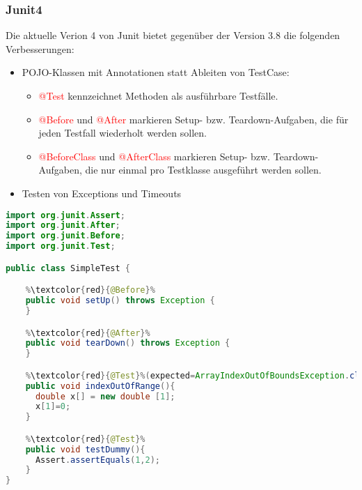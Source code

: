 \subsubsection{Junit4}
Die aktuelle Verion 4 von Junit bietet gegenüber der Version 3.8
die folgenden Verbesserungen:
\begin{itemize}
\item POJO-Klassen mit Annotationen statt Ableiten von TestCase:
\begin{itemize}
\item \textcolor{red}{@Test} kennzeichnet Methoden als ausführbare Testfälle.
\item \textcolor{red}{@Before} und \textcolor{red}{@After}
  markieren Setup- bzw. Teardown-Aufgaben, die
  für jeden Testfall wiederholt werden sollen.
\item \textcolor{red}{@BeforeClass} und \textcolor{red}{@AfterClass}
  markieren Setup-
  bzw. Teardown-Aufgaben, die nur einmal pro Testklasse ausgeführt
  werden sollen.
\end{itemize}
\item Testen von Exceptions und Timeouts
\end{itemize}
\newslide
\begin{lstlisting}[language=java,escapechar=\%]
import org.junit.Assert;
import org.junit.After;
import org.junit.Before;
import org.junit.Test;

public class SimpleTest {

    %\textcolor{red}{@Before}%
    public void setUp() throws Exception {
    }

    %\textcolor{red}{@After}%
    public void tearDown() throws Exception {
    }

    %\textcolor{red}{@Test}%(expected=ArrayIndexOutOfBoundsException.class)
    public void indexOutOfRange(){
      double x[] = new double [1];
      x[1]=0;
    }

    %\textcolor{red}{@Test}%
    public void testDummy(){
      Assert.assertEquals(1,2);
    }
}
\end{lstlisting}
%
%
\newslide
